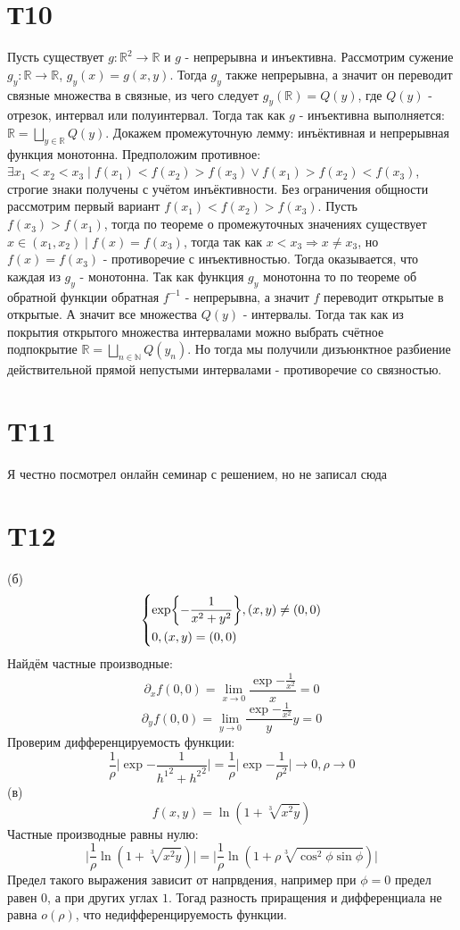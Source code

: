 \documentclass[12pt]{article}
\begin{document}
\section{Т10}
Пусть существует $g:\mathbb{R}^2 \to \mathbb{R}$ и $g$ - непрерывна и инъективна. Рассмотрим сужение $g_y: \mathbb{R} \to \mathbb{R}$, $g_y(x) = g(x, y)$.
Тогда $g_y$ также непрерывна, а значит он переводит связные множества в связные, из чего следует $g_y(\mathbb{R}) = Q(y)$, где $Q(y)$ - отрезок, интервал или полуинтервал.
Тогда так как $g$ - инъективна выполняется: $\mathbb{R} = \bigsqcup_{y \in \mathbb{R}} Q(y)$.
Докажем промежуточную лемму: инъёктивная и непрерывная функция монотонна. Предположим противное:
$\exists x_1 < x_2 < x_3 \mid f(x_1) < f(x_2) > f(x_3) \lor f(x_1) > f(x_2) < f(x_3)$, строгие знаки 
получены с учётом инъёктивности. Без ограничения общности рассмотрим первый вариант $f(x_1) < f(x_2) > f(x_3)$.
Пусть $f(x_3) > f(x_1)$, тогда по теореме о промежуточных значениях существует $x \in (x_1, x_2) \mid f(x) = f(x_3)$, 
тогда так как $x < x_3 \Rightarrow x \not = x_3$, но $f(x) = f(x_3)$ - противоречие с инъективностью.
Тогда оказывается, что каждая из $g_y$ - монотонна. Так как функция $g_y$ монотонна то по теореме об обратной
функции обратная $f^{-1}$ - непрерывна, а значит $f$ переводит открытые в открытые. А значит все множества
$Q(y)$ - интервалы. Тогда так как из покрытия открытого множества интервалами можно выбрать счётное подпокрытие $\mathbb{R} = \bigsqcup_{n \in \mathbb{N}} Q(y_n)$.
Но тогда мы получили дизъюнктное разбиение действительной прямой непустыми интервалами - противоречие со связностью.
\section{T11}
Я честно посмотрел онлайн семинар с решением, но не записал сюда
\section{T12}
(б)
\[
    \begin{dcases}
        \exp{-\frac{1}{x^{2} + y^{2}}}, (x, y) \not = (0, 0)\\
        0, (x, y) = (0, 0)\\
    \end{dcases}
\]
Найдём частные производные:
\[
    \partial_x f(0, 0) = \lim_{x \to 0}{\frac{\exp{-\frac{1}{x^2}}}{x}} = 0 
\]
\[
    \partial_y f(0, 0) = \lim_{y \to 0}{\frac{\exp{-\frac{1}{x^2}}}{y}}{y} = 0
\]
Проверим дифференцируемость функции:
\[
    \frac{1}{\rho }\vert \exp{-\frac{1}{{h^1}^{2} + {h^2}^{2}  }} \vert = \frac{1}{\rho }\vert \exp{-\frac{1}{\rho^{2} }} \vert \to 0, \rho \to 0
\]
(в)
\[
    f(x, y) = \ln(1 + \sqrt[3]{x^{2} y})
\]
Частные производные равны нулю: 
\[
    \vert \frac{1}{\rho }\ln(1 + \sqrt[3]{x^{2} y}) \vert = \vert \frac{1}{\rho }\ln(1 + \rho \sqrt[3]{\cos^{2}{\phi} \sin \phi}) \vert
\]
Предел такого выражения зависит от напрвдения, например при \(\phi = 0\) предел равен 0, а при других углах \(1\). Тогад разность приращения и дифференциала
не равна \(o(\rho )\), что недифференцируемость функции.   
\end{document}
